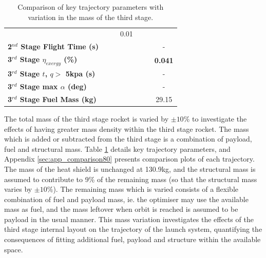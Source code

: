 \begin{table}[ht]
\begin{tabular}{l c c c c c c}
		& \secondthirdSeparationLDmThreeOneHundredFiveNoReturn
		& \secondthirdSeparationLDmThreeOneHundredTenNoReturn
		&0.01
		\\
		\textbf{2$^{nd}$ Stage Flight Time (s)}
		& \secondFlightTimemThreeNinetyNoReturn
		& \secondFlightTimemThreeNinetyFiveNoReturn
		& \secondFlightTimemThreeStandardNoReturn
		& \secondFlightTimemThreeOneHundredFiveNoReturn
		& \secondFlightTimemThreeOneHundredTenNoReturn
		& -
		\\
		\hline 
		\textbf{3$^{rd}$ Stage $\eta_{exergy}$ (\%)}
		& \textbf{\thirddExergyEffmThreeNinetyNoReturn}
		& \textbf{\thirddExergyEffmThreeNinetyFiveNoReturn}
		& \textbf{\thirddExergyEffmThreeStandardNoReturn}
		& \textbf{\thirddExergyEffmThreeOneHundredFiveNoReturn}
		& \textbf{\thirddExergyEffmThreeOneHundredTenNoReturn}
		& \textbf{0.041}
		\\
		\textbf{3$^{rd}$ Stage $t$, $q >$ 5kpa (s)}
		& \thirdqOverFivemThreeNinetyNoReturn
		& \thirdqOverFivemThreeNinetyFiveNoReturn
		& \thirdqOverFivemThreeStandardNoReturn
		& \thirdqOverFivemThreeOneHundredFiveNoReturn
		& \thirdqOverFivemThreeOneHundredTenNoReturn
		& -
		\\
		\textbf{3$^{rd}$ Stage max $\alpha$ (deg)}
		& \thirdmaxAoAmThreeNinetyNoReturn
		& \thirdmaxAoAmThreeNinetyFiveNoReturn
		& \thirdmaxAoAmThreeStandardNoReturn
		& \thirdmaxAoAmThreeOneHundredFiveNoReturn
		& \thirdmaxAoAmThreeOneHundredTenNoReturn
		& -
		\\
		\textbf{3$^{rd}$ Stage Fuel Mass (kg)}
		& \thirdmFuelmThreeNinetyNoReturn
		& \thirdmFuelmThreeNinetyFiveNoReturn
		& \thirdmFuelmThreeStandardNoReturn
		& \thirdmFuelmThreeOneHundredFiveNoReturn
		& \thirdmFuelmThreeOneHundredTenNoReturn
		&29.15
		\\
		\hline 
	\end{tabular} 
	\caption{Comparison of key trajectory parameters with variation in the mass of the third stage.}
	\label{tab:comparison80}
\end{table}


The total mass of the third stage rocket is varied by $\pm10\%$ to investigate the effects of having greater mass density within the third stage rocket. The mass which is added or subtracted from the third stage is a combination of payload, fuel and structural mass. Table \ref{tab:comparison80} details key trajectory parameters, and Appendix \ref{sec:app_comparison80} presents comparison plots of each trajectory. 
The mass of the heat shield is unchanged at 130.9kg, and the structural mass is assumed to contribute to 9\% of the remaining mass (so that the structural mass varies by $\pm10\%$). The remaining mass which is varied consists of a flexible combination of fuel and payload mass, ie. the optimiser may use the available mass as fuel, and the mass leftover when orbit is reached is assumed to be payload in the usual manner. 
This mass variation investigates the effects of the third stage internal layout on the trajectory of the launch system, quantifying the consequences of fitting additional fuel, payload and structure within the available space.

